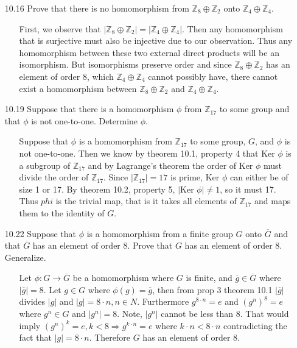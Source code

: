 \documentclass[12pt]{article}
\begin{document}
\begin{enumerate}
\item[10.16] Prove that there is no homomorphism from $\mathbb{Z}_8 \oplus \mathbb{Z}_2$ onto
$\mathbb{Z}_4 \oplus \mathbb{Z}_4$.
\begin{enumerate}
\item[] First, we observe that $|\mathbb{Z}_8 \oplus \mathbb{Z}_2| = |\mathbb{Z}_4
\oplus \mathbb{Z}_4|$. Then any homomorphism that is surjective must also be injective due
to our observation. Thus any homomorphism between these two external direct products will be an
isomorphism. But isomorphisms preserve order and since $\mathbb{Z}_8 \oplus \mathbb{Z}_2$ has
an element of order 8, which $\mathbb{Z}_4 \oplus \mathbb{Z}_4$ cannot possibly have, there 
cannot exist a homomorphism between $\mathbb{Z}_8 \oplus \mathbb{Z}_2$ and $\mathbb{Z}_4
\oplus \mathbb{Z}_4$.
\end{enumerate}

\item[10.19] Suppose that there is a homomorphism $\phi$ from $\mathbb{Z}_{17}$ to some
group and that $\phi$ is not one-to-one. Determine $\phi$.
\begin{enumerate}
\item[] Suppose that $\phi$ is a homomorphism from $\mathbb{Z}_{17}$ to some group, $G$, and 
$\phi$ is not one-to-one. Then we know by theorem 10.1, property 4 that Ker $\phi$ is a 
subgroup of $\mathbb{Z}_{17}$ and by Lagrange's theorem the order of Ker $\phi$ must divide the order 
of $\mathbb{Z}_{17}$. Since $|\mathbb{Z}_{17}| = 17$ is prime, Ker $\phi$ can either be 
of size 1 or 17. By theorem 10.2, property 5, $|$Ker $\phi | \neq 1$, so it must 17. Thus
$phi$ is the trivial map, that is it takes all elements of $\mathbb{Z}_{17}$ and maps them to
the identity of $G$.
\end{enumerate}

\item[10.22] Suppose that $\phi$ is a homomorphism from a finite group $G$ onto $\overline{G}$ and
that $\overline{G}$ has an element of order 8. Prove that $G$ has an element of order $8$. Generalize.
\begin{enumerate}
\item[]
Let $\phi: G \rightarrow \overline{G}$ be a homomorphism where $G$ is finite, 
and $\overline{g} \in \overline{G}$ where $|\overline{g}| = 8$. 
Let $g \in G$ where $\phi(g) = \overline{g}$, then from prop 3 theorem 10.1 $|\overline{g}|$
divides $|g|$ and $|g| = 8 · n, n \in N$. Furthermore $g^{8·n} = e$ and
$(g^n)^8 = e$ where $g^n \in G$ and $|g^n| = 8$.
Note, $|g^n|$ cannot be less than 8. That would imply $(g^n)^k = e, k < 8 \Rightarrow 
g^{k·n} = e$ where $k \cdot n < 8 \cdot n$ contradicting the fact that $|g| = 8 \cdot n$.
Therefore $G$ has an element of order 8.
\end{enumerate}


\end{enumerate}
\end{document}
